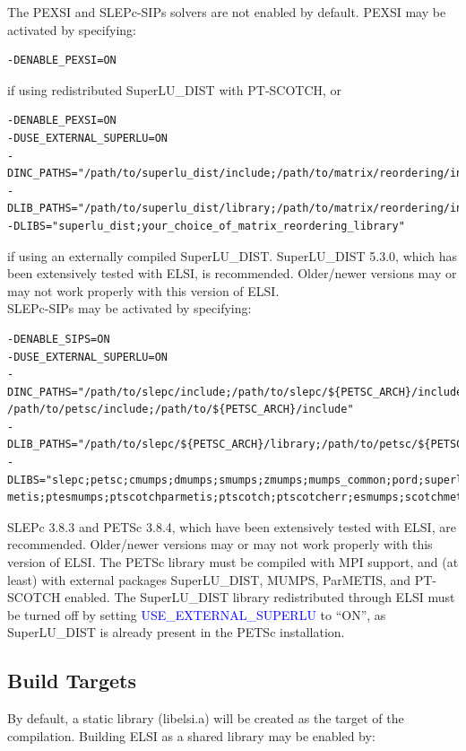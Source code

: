 \documentclass{report}
\begin{document}
The PEXSI and SLEPc-SIPs solvers are not enabled by default.  PEXSI may be activated by specifying:\\

\begin{verbatim}
-DENABLE_PEXSI=ON
\end{verbatim}

if using redistributed SuperLU\_DIST with PT-SCOTCH, or\\

\begin{verbatim}
-DENABLE_PEXSI=ON
-DUSE_EXTERNAL_SUPERLU=ON
-DINC_PATHS="/path/to/superlu_dist/include;/path/to/matrix/reordering/include"
-DLIB_PATHS="/path/to/superlu_dist/library;/path/to/matrix/reordering/include"
-DLIBS="superlu_dist;your_choice_of_matrix_reordering_library"
\end{verbatim}

if using an externally compiled SuperLU\_DIST.  SuperLU\_DIST 5.3.0, which has been extensively tested with ELSI, is recommended.  Older/newer versions may or may not work properly with this version of ELSI.\\

SLEPc-SIPs may be activated by specifying:\\

\begin{verbatim}
-DENABLE_SIPS=ON
-DUSE_EXTERNAL_SUPERLU=ON
-DINC_PATHS="/path/to/slepc/include;/path/to/slepc/${PETSC_ARCH}/include;
/path/to/petsc/include;/path/to/${PETSC_ARCH}/include"
-DLIB_PATHS="/path/to/slepc/${PETSC_ARCH}/library;/path/to/petsc/${PETSC_ARCH}/library"
-DLIBS="slepc;petsc;cmumps;dmumps;smumps;zmumps;mumps_common;pord;superlu_dist;parmetis;
metis;ptesmumps;ptscotchparmetis;ptscotch;ptscotcherr;esmumps;scotchmetis;scotch;scotcherr"
\end{verbatim}

SLEPc 3.8.3 and PETSc 3.8.4, which have been extensively tested with ELSI, are recommended.  Older/newer versions may or may not work properly with this version of ELSI.  The PETSc library must be compiled with MPI support, and (at least) with external packages SuperLU\_DIST, MUMPS, ParMETIS, and PT-SCOTCH enabled.  The SuperLU\_DIST library redistributed through ELSI must be turned off by setting \textcolor{blue}{USE\_EXTERNAL\_SUPERLU} to ``ON'', as SuperLU\_DIST is already present in the PETSc installation.\\

\subsection{Build Targets}
\label{subsec:config_targets}
By default, a static library (libelsi.a) will be created as the target of the compilation.  Building ELSI as a shared library may be enabled by:\\
\end{document}
